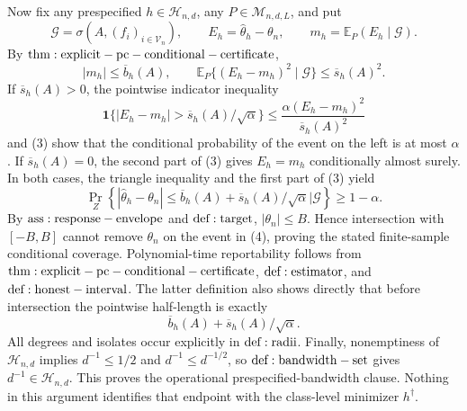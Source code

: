 Now fix any prespecified \(h\in\mathcal H_{n,d}\), any \(P\in\mathcal M_{n,d,L}\), and put
\[
 \mathcal G=\sigma\!\left(A,(f_i)_{i\in\mathcal V_n}\right),
 \qquad E_h=\widehat\theta_h-\theta_n,
 \qquad m_h=\mathbb E_P(E_h\mid\mathcal G).
\tag{2}
\]
By \({\rm thm:explicit-pc-conditional-certificate}\),
\[
 |m_h|\leq\overline b_h(A),
 \qquad
 \mathbb E_P\{(E_h-m_h)^2\mid\mathcal G\}
 \leq\overline s_h(A)^2.
\tag{3}
\]
If \(\overline s_h(A)>0\), the pointwise indicator inequality
\[
 \mathbf1\{|E_h-m_h|>\overline s_h(A)/\sqrt\alpha\}
 \leq\frac{\alpha(E_h-m_h)^2}{\overline s_h(A)^2}
\]
and (3) show that the conditional probability of the event on the left is at most \(\alpha\).  If \(\overline s_h(A)=0\), the second part of (3) gives \(E_h=m_h\) conditionally almost surely.  In both cases, the triangle inequality and the first part of (3) yield
\[
 \Pr_Z\!\left\{
 |\widehat\theta_h-\theta_n|
 \leq\overline b_h(A)+\overline s_h(A)/\sqrt\alpha
 \mathrel{\Big|}\mathcal G\right\}\geq1-\alpha.
\tag{4}
\]
By \({\rm ass:response-envelope}\) and \({\rm def:target}\), \(|\theta_n|\leq B\).  Hence intersection with \([-B,B]\) cannot remove \(\theta_n\) on the event in (4), proving the stated finite-sample conditional coverage.  Polynomial-time reportability follows from \({\rm thm:explicit-pc-conditional-certificate}\), \({\rm def:estimator}\), and \({\rm def:honest-interval}\).  The latter definition also shows directly that before intersection the pointwise half-length is exactly
\[
 \overline b_h(A)+\overline s_h(A)/\sqrt\alpha.
\tag{5}
\]
All degrees and isolates occur explicitly in \({\rm def:radii}\).  Finally, nonemptiness of \(\mathcal H_{n,d}\) implies \(d^{-1}\leq1/2\) and \(d^{-1}\leq d^{-1/2}\), so \({\rm def:bandwidth-set}\) gives \(d^{-1}\in\mathcal H_{n,d}\).  This proves the operational prespecified-bandwidth clause.  Nothing in this argument identifies that endpoint with the class-level minimizer \(h^\dagger\).

